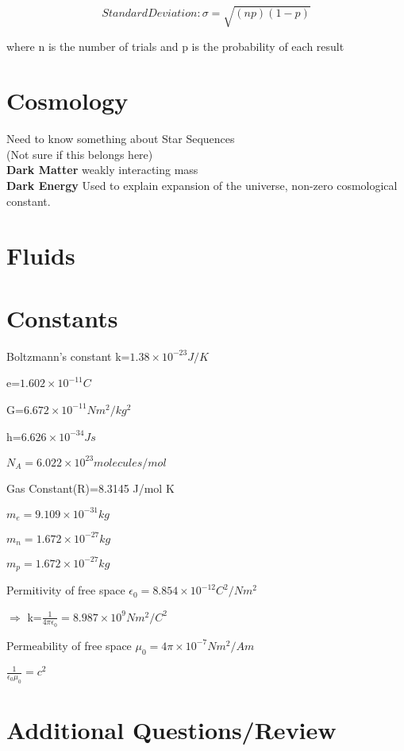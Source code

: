 \documentclass{article}
\begin{document}
\begin{equation}Standard Deviation: \sigma = \sqrt{(np)(1-p)}\end{equation}

where n is the number of trials and p is the probability of each result





\section{Cosmology}
Need to know something about Star Sequences
\\
(Not sure if this belongs here)\\
{\bf{Dark Matter}} weakly interacting mass\\
{\bf{Dark Energy}} Used to explain expansion of the universe, non-zero cosmological constant.






\section{Fluids}









\section{Constants}
Boltzmann's constant k=$1.38\times10^{-23} J/K$

e=$1.602\times10^{-11}C$

G=$6.672\times10^{-11}Nm^2/kg^2$

h=$6.626\times10^{-34}Js$

$N_A=6.022\times10^{23}molecules/mol$

Gas Constant(R)=8.3145 J/mol K

$m_e=9.109\times10^{-31}kg$

$m_n=1.672\times10^{-27}kg$

$m_p=1.672\times10^{-27}kg$

Permitivity of free space $\epsilon_0=8.854\times10^{-12}C^2/N m^2$

$\Rightarrow$ k=$\frac{1}{4\pi \epsilon_0}=8.987\times10^{9} Nm^2/C^2$

Permeability of free space $\mu_0=4\pi \times10^{-7}Nm^2/A m$

$\frac{1}{\epsilon_0 \mu_0} = c^2$









\section{Additional Questions/Review}
\end{document}
